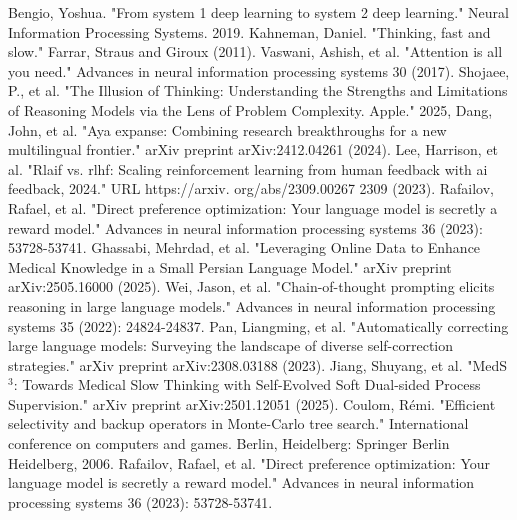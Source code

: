 \documentclass[conference]{IEEEtran}
\begin{document}
	
	
	\begin{thebibliography}{00}
                Bengio, Yoshua. "From system 1 deep learning to system 2 deep learning." Neural Information Processing Systems. 2019. 
               Kahneman, Daniel. "Thinking, fast and slow." Farrar, Straus and Giroux (2011).
		Vaswani, Ashish, et al. "Attention is all you need." Advances in neural information processing systems 30 (2017).
		Shojaee, P., et al. "The Illusion of Thinking: Understanding the Strengths and Limitations of Reasoning Models via the Lens of Problem Complexity. Apple." 2025,
               Dang, John, et al. "Aya expanse: Combining research breakthroughs for a new multilingual frontier." arXiv preprint arXiv:2412.04261 (2024).
              Lee, Harrison, et al. "Rlaif vs. rlhf: Scaling reinforcement learning from human feedback with ai feedback, 2024." URL https://arxiv. org/abs/2309.00267 2309 (2023).
              Rafailov, Rafael, et al. "Direct preference optimization: Your language model is secretly a reward model." Advances in neural information processing systems 36 (2023): 53728-53741.
             Ghassabi, Mehrdad, et al. "Leveraging Online Data to Enhance Medical Knowledge in a Small Persian Language Model." arXiv preprint arXiv:2505.16000 (2025).
             Wei, Jason, et al. "Chain-of-thought prompting elicits reasoning in large language models." Advances in neural information processing systems 35 (2022): 24824-24837.
             Pan, Liangming, et al. "Automatically correcting large language models: Surveying the landscape of diverse self-correction strategies." arXiv preprint arXiv:2308.03188 (2023).
             Jiang, Shuyang, et al. "MedS$^ 3$: Towards Medical Slow Thinking with Self-Evolved Soft Dual-sided Process Supervision." arXiv preprint arXiv:2501.12051 (2025).
             Coulom, Rémi. "Efficient selectivity and backup operators in Monte-Carlo tree search." International conference on computers and games. Berlin, Heidelberg: Springer Berlin Heidelberg, 2006.
             Rafailov, Rafael, et al. "Direct preference optimization: Your language model is secretly a reward model." Advances in neural information processing systems 36 (2023): 53728-53741.

\end{thebibliography}
\end{document}
